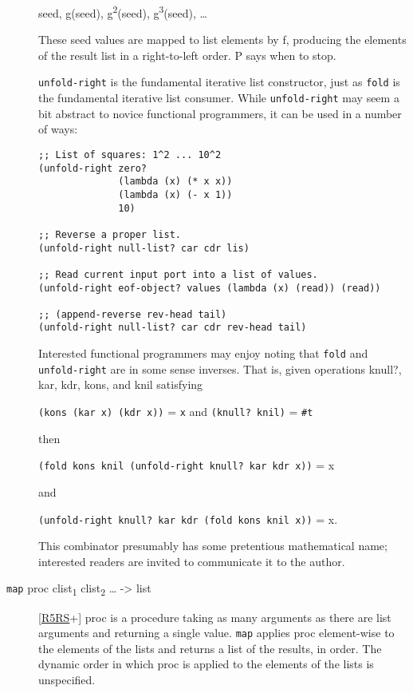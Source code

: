 \begin{description}
seed, g(seed), g\textsuperscript{2}(seed), g\textsuperscript{3}(seed),
\ldots{}

These seed values are mapped to list elements by f, producing the
elements of the result list in a right-to-left order. P says when to
stop.

\texttt{unfold-right} is the fundamental iterative list constructor,
just as \texttt{fold} is the fundamental iterative list consumer. While
\texttt{unfold-right} may seem a bit abstract to novice functional
programmers, it can be used in a number of ways:

\begin{verbatim}
;; List of squares: 1^2 ... 10^2
(unfold-right zero? 
              (lambda (x) (* x x))
              (lambda (x) (- x 1))
              10)
    
;; Reverse a proper list.
(unfold-right null-list? car cdr lis)

;; Read current input port into a list of values.
(unfold-right eof-object? values (lambda (x) (read)) (read))

;; (append-reverse rev-head tail)
(unfold-right null-list? car cdr rev-head tail)
\end{verbatim}

Interested functional programmers may enjoy noting that \texttt{fold}
and \texttt{unfold-right} are in some sense inverses. That is, given
operations knull?, kar, kdr, kons, and knil satisfying

\texttt{(kons\ (kar\ x)\ (kdr\ x))} = \texttt{x} and
\texttt{(knull?\ knil)} = \texttt{\#t}

then

\texttt{(fold\ kons\ knil\ (unfold-right\ knull?\ kar\ kdr\ x))} = x

and

\texttt{(unfold-right\ knull?\ kar\ kdr\ (fold\ kons\ knil\ x))} = x.

This combinator presumably has some pretentious mathematical name;
interested readers are invited to communicate it to the author.
\item[ \href{}{} \texttt{map} proc clist\textsubscript{1}
clist\textsubscript{2} \ldots{} -\textgreater{} list ]
{[}\protect\hyperlink{R5RS}{R5RS}+{]} proc is a procedure taking as many
arguments as there are list arguments and returning a single value.
\texttt{map} applies proc element-wise to the elements of the lists and
returns a list of the results, in order. The dynamic order in which proc
is applied to the elements of the lists is unspecified.


\end{description}

